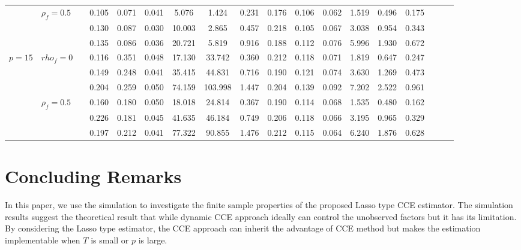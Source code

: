 \documentclass[11pt,a4paper]{article}
\theoremstyle{definition}
\begin{document}
\begin{landscape}
\begin{center}
\begin{longtable}{lllccccccccccccccc}
\cmidrule(lr){4-6}\cmidrule(lr){7-9}\cmidrule(lr){10-12}\cmidrule(lr){13-15}
        &  $\rho_f=0.5$ &          &  0.105 &  0.071 &  0.041 &   5.076 &    1.424 &  0.231 &  0.176 &  0.106 &  0.062 &  1.519 &  0.496 &  0.175 \\
        &               &          &  0.130 &  0.087 &  0.030 &  10.003 &    2.865 &  0.457 &  0.218 &  0.105 &  0.067 &  3.038 &  0.954 &  0.343 \\
        &               &          &  0.135 &  0.086 &  0.036 &  20.721 &    5.819 &  0.916 &  0.188 &  0.112 &  0.076 &  5.996 &  1.930 &  0.672 \\
\midrule
 $p=15$ &     $rho_f=0$ &          &  0.116 &  0.351 &  0.048 &  17.130 &   33.742 &  0.360 &  0.212 &  0.118 &  0.071 &  1.819 &  0.647 &  0.247 \\
        &               &          &  0.149 &  0.248 &  0.041 &  35.415 &   44.831 &  0.716 &  0.190 &  0.121 &  0.074 &  3.630 &  1.269 &  0.473 \\
        &               &          &  0.204 &  0.259 &  0.050 &  74.159 &  103.998 &  1.447 &  0.204 &  0.139 &  0.092 &  7.202 &  2.522 &  0.961 \\
\cmidrule(lr){4-6}\cmidrule(lr){7-9}\cmidrule(lr){10-12}\cmidrule(lr){13-15}
        &  $\rho_f=0.5$ &          &  0.160 &  0.180 &  0.050 &  18.018 &   24.814 &  0.367 &  0.190 &  0.114 &  0.068 &  1.535 &  0.480 &  0.162 \\
        &               &          &  0.226 &  0.181 &  0.045 &  41.635 &   46.184 &  0.749 &  0.206 &  0.118 &  0.066 &  3.195 &  0.965 &  0.329 \\
        &               &          &  0.197 &  0.212 &  0.041 &  77.322 &   90.855 &  1.476 &  0.212 &  0.115 &  0.064 &  6.240 &  1.876 &  0.628 \\
\bottomrule
\end{longtable}
\end{center}
\end{landscape}

\section{Concluding Remarks}\label{Sec:conclude}
In this paper, we use the simulation to investigate the finite sample properties of the proposed Lasso type CCE estimator. The simulation results suggest the theoretical result that while dynamic CCE approach ideally can control the unobserved factors but it has its limitation. By considering the Lasso type estimator, the CCE approach can inherit the advantage of CCE method but makes the estimation implementable when $T$ is small or $p$ is large.


\bigskip




\end{document}
